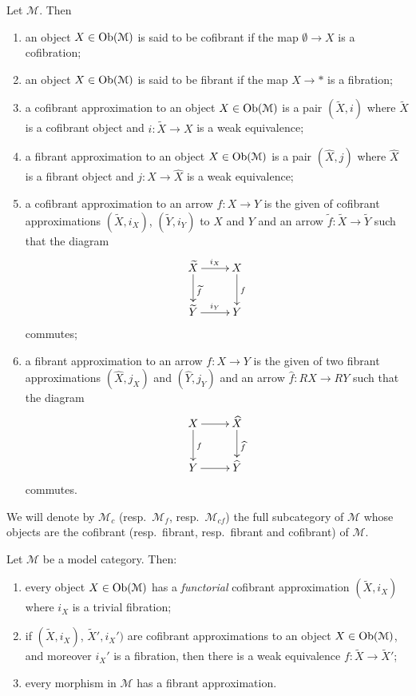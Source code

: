 \begin{refsection}
\begin{defin}
Let $\mathcal M$. Then
\begin{enumerate}
\item an object $X \in \operatorname{Ob}(\mathcal M)$ is said to be cofibrant if the map $\emptyset \to X$ is a cofibration;
\item an object $X \in \operatorname{Ob}(\mathcal M)$ is said to be fibrant if the map $X \to *$ is a fibration;
\item a cofibrant approximation to an object $X \in \operatorname{Ob}(\mathcal M)$ is a pair $(\widetilde{X},i)$ where $\widetilde{X}$ is a cofibrant object and $i \colon \widetilde{X} \to X$ is a weak equivalence;
\item a fibrant approximation to an object $X \in \operatorname{Ob}(\mathcal M)$ is a pair $(\widehat{X},j)$ where $\widehat{X}$ is a fibrant object and $j \colon X \to \widehat{X}$ is a weak equivalence;
\item a cofibrant approximation to an arrow $f \colon X \to Y$ is the given of cofibrant approximations $(\widetilde{X},i_X)$, $(\widetilde{Y},i_Y)$ to $X$ and $Y$ and an arrow $\widetilde{f} \colon \widetilde{X} \to \widetilde{Y}$ such that the diagram
\[
\xymatrix{ \widetilde{X} \ar[r]^{i_X} \ar[d]^{\widetilde{f}} & X \ar[d]^f \\ \widetilde{Y} \ar[r]^{i_Y} & Y }
\]
commutes;
\item a fibrant approximation to an arrow $f \colon X \to Y$ is the given of two fibrant approximations $(\widehat{X},j_X)$ and $(\widehat{Y},j_Y)$ and an arrow $\widehat{f} \colon RX \to RY$ such that the diagram
\[
\xymatrix{ X \ar[r] \ar[d]^f & \widehat{X} \ar[d]^{\widehat{f}} \\ Y \ar[r] & \widehat{Y} }
\]
commutes.
\end{enumerate}
We will denote by $\mathcal M_c$ (resp.\ $\mathcal M_f$, resp.\ $\mathcal M_{cf}$) the full subcategory of $\mathcal M$ whose objects are the cofibrant (resp.\ fibrant, resp.\ fibrant and cofibrant) of $\mathcal M$.
\end{defin}

\begin{prop} \label{prop approximations}
Let $\mathcal M$ be a model category. Then:
\begin{enumerate}
\item every object $X \in \operatorname{Ob}(\mathcal M)$ has a \emph{functorial} cofibrant approximation $(\widetilde{X},i_X)$ where $i_X$ is a trivial fibration;
\item if $(\widetilde{X},i_X)$, $\widetilde{X}',i_X')$ are cofibrant approximations to an object $X \in \operatorname{Ob}(\mathcal M)$, and moreover $i_X'$ is a fibration, then there is a weak equivalence $f \colon \widetilde{X} \to \widetilde{X}'$;
\item every morphism in $\mathcal M$ has a fibrant approximation.
\end{enumerate}
\end{prop}


\end{refsection}
